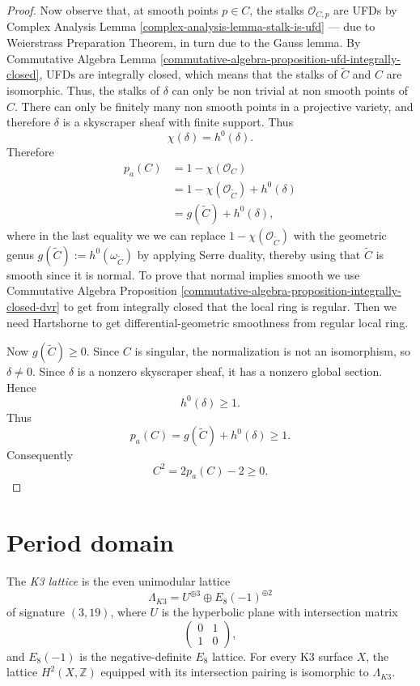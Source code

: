 \begin{proof}
Now observe that, at smooth
points $p \in C$, the stalks
$\mathcal{O}_{C,p}$ are
UFDs by Complex Analysis
Lemma \ref{complex-analysis-lemma-stalk-is-ufd}
--- due to Weierstrass Preparation
Theorem, in turn due to the Gauss lemma.
By Commutative Algebra Lemma
\ref{commutative-algebra-proposition-ufd-integrally-closed},
UFDs are integrally closed,
which means that the stalks
of $\tilde{C}$ and $C$ are isomorphic.
Thus, the stalks of $\delta$
can only be non trivial at non smooth
points of $C$. There can only
be finitely many non smooth points
in a projective variety,
and therefore $\delta$
is a skyscraper sheaf with finite support.
Thus
$$
\chi(\delta)=h^0(\delta).
$$
Therefore
$$
\begin{aligned}
p_a(C)
&= 1-\chi(\mathcal O_C) \\
&= 1-\chi(\mathcal O_{\widetilde C})
   + h^0(\delta) \\
&= g(\widetilde C)+h^0(\delta),
\end{aligned}
$$
where in the last equality
we we can replace
$1-\chi(\mathcal{O}_{\widetilde{C}})$
with the geometric genus
$g(\widetilde{C}):=
h^0(\omega_{\widetilde{C}})$
by applying Serre duality,
thereby using that $\widetilde{C}$
is smooth since it is normal.
To prove that normal implies
smooth we use
Commutative Algebra
Proposition
\ref{commutative-algebra-proposition-integrally-closed-dvr}
to get from integrally closed
that the local ring is regular.
Then we need Hartshorne
to get differential-geometric smoothness
from regular local ring.

Now $g(\widetilde C)\geq 0$. Since $C$ is
singular, the normalization is not an
isomorphism, so $\delta\neq 0$. Since
$\delta$ is a nonzero skyscraper sheaf, it
has a nonzero global section. Hence
$$
h^0(\delta)\geq 1.
$$
Thus
$$
p_a(C)=g(\widetilde C)+h^0(\delta)\geq 1.
$$
Consequently
$$
C^2=2p_a(C)-2\geq 0.
$$
\end{proof}



\section{Period domain}
\label{section-period-domain}

\begin{definition}
\label{definition-k3-lattice}
The {\it K3 lattice} is the even
unimodular lattice
$$
\Lambda_{K3}
=
U^{\oplus 3}\oplus E_8(-1)^{\oplus 2}
$$
of signature $(3,19)$, where $U$ is the
hyperbolic plane with intersection matrix
$$
\begin{pmatrix}
0&1\\
1&0
\end{pmatrix},
$$
and $E_8(-1)$ is the negative-definite
$E_8$ lattice.
For every K3 surface $X$, the lattice
$H^2(X,\mathbb{Z})$ equipped with its
intersection pairing is isomorphic to
$\Lambda_{K3}$.
\end{definition}

